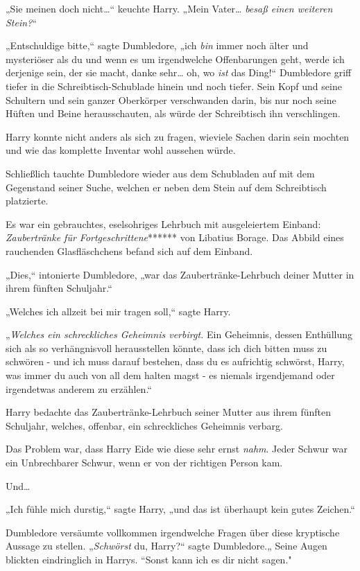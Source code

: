 {„Sie meinen doch nicht…“ keuchte Harry. „Mein Vater… \emph{besaß einen weiteren Stein?}“

„Entschuldige bitte,“ sagte Dumbledore, „ich \emph{bin} immer noch älter und mysteriöser als du und wenn es um irgendwelche Offenbarungen geht, werde ich derjenige sein, der sie macht, danke sehr… oh, wo \emph{ist} das Ding!“ Dumbledore griff tiefer in die Schreibtisch-Schublade hinein und noch tiefer. Sein Kopf und seine Schultern und sein ganzer Oberkörper verschwanden darin, bis nur noch seine Hüften und Beine herausschauten, als würde der Schreibtisch ihn verschlingen.

Harry konnte nicht anders als sich zu fragen, wieviele Sachen darin sein mochten und wie das komplette Inventar wohl aussehen würde.

Schließlich tauchte Dumbledore wieder aus dem Schubladen auf mit dem Gegenstand seiner Suche, welchen er neben dem Stein auf dem Schreibtisch platzierte.

Es war ein gebrauchtes, eselsohriges Lehrbuch mit ausgeleiertem Einband: \emph{Zaubertränke für Fortgeschrittene}****** von Libatius Borage. Das Abbild eines rauchenden Glasfläschchens befand sich auf dem Einband.

„Dies,“ intonierte Dumbledore, „war das Zaubertränke-Lehrbuch deiner Mutter in ihrem fünften Schuljahr.“

„Welches ich allzeit bei mir tragen soll,“ sagte Harry.

„\emph{Welches ein schreckliches Geheimnis verbirgt.} Ein Geheimnis, dessen Enthüllung sich als so verhängnisvoll herausstellen könnte, dass ich dich bitten muss zu schwören - und ich muss darauf bestehen, dass du es aufrichtig schwörst, Harry, was immer du auch von all dem halten magst - es niemals irgendjemand oder irgendetwas anderem zu erzählen.“

Harry bedachte das Zaubertränke-Lehrbuch seiner Mutter aus ihrem fünften Schuljahr, welches, offenbar, ein schreckliches Geheimnis verbarg.

Das Problem war, dass Harry Eide wie diese sehr ernst \emph{nahm}. Jeder Schwur war ein Unbrechbarer Schwur, wenn er von der richtigen Person kam.

Und…

„Ich fühle mich durstig,“ sagte Harry, „und das ist überhaupt kein gutes Zeichen.“

Dumbledore versäumte vollkommen irgendwelche Fragen über diese kryptische Aussage zu stellen. „\emph{Schwörst} du, Harry?“ sagte Dumbledore.„ Seine Augen blickten eindringlich in Harrys. “Sonst kann ich es dir nicht sagen."

}

